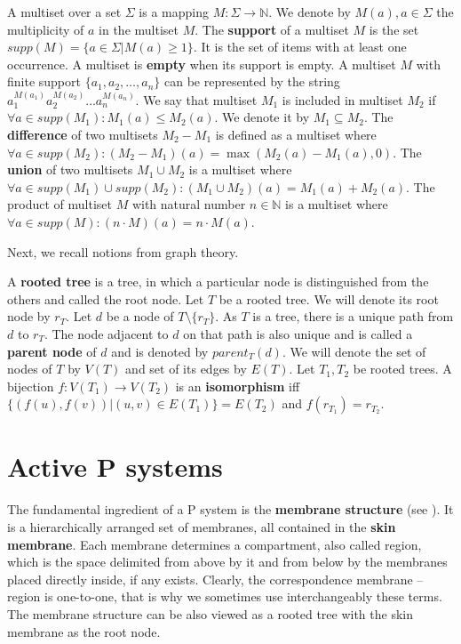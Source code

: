 \documentclass[llncs,submission,copyright,creativecommons]{../lib/lncs/llncs}
\begin{document}
A multiset over a set $\Sigma$ is a mapping $M: \Sigma\rightarrow \mathbb N$.
We denote by $M(a), a\in \Sigma$ the multiplicity of $a$ in the multiset $M$.
The {\bf support} of a multiset $M$ is the set $supp(M)=\{a\in \Sigma|M(a)\geq 1\}$.
It is the set of items with at least one occurrence.
A multiset is {\bf empty} when its support is empty.
A multiset $M$ with finite support $\{a_1, a_2, \dots, a_n\}$ can be represented by the string $a_1^{M(a_1)}a_2^{M(a_2)}\dots a_n^{M(a_n)}$.
We say that multiset $M_1$ is included in multiset $M_2$ if $\forall a \in supp(M_1): M_1(a)\leq M_2(a)$.
We denote it by $M_1\subseteq M_2$.
The {\bf difference} of two multisets $M_2-M_1$ is defined as a multiset where $\forall a \in supp(M_2): (M_2-M_1)(a)=\max(M_2(a)-M_1(a),0)$.
The {\bf union} of two multisets $M_1\cup M_2$ is a multiset where $\forall a \in supp(M_1)\cup supp(M_2): (M_1\cup M_2)(a)=M_1(a)+M_2(a)$.
The product of multiset $M$ with natural number $n\in \mathbb N$ is a multiset where $\forall a \in supp(M): (n\cdot M)(a)=n\cdot M(a)$.

Next, we recall notions from graph theory.

A {\bf rooted tree} is a tree, in which a particular node is distinguished from the others and called the root node.
Let $T$ be a rooted tree. We will denote its root node by $r_T$.
Let $d$ be a node of $T\setminus\{r_T\}$.
As $T$ is a tree, there is a unique path from $d$ to $r_T$. 
The node adjacent to $d$ on that path is also unique and is called a {\bf parent node} of $d$ and is denoted by $parent_T(d)$.
We will denote the set of nodes of $T$ by $V(T)$ and set of its edges by $E(T)$.
Let $T_1, T_2$ be rooted trees. A bijection $f: V(T_1)\rightarrow V(T_2)$ is an {\bf isomorphism} iff $\{(f(u),f(v))|(u,v)\in E(T_1)\} = E(T_2)$ and $f(r_{T_1}) = r_{T_2}$. 

  
\section{Active P systems}
\label{sec:p systems}


The fundamental ingredient of a P system is the {\bf membrane structure} (see \cite{Paun2006Introduction}). It is a hierarchically arranged set of membranes, all contained in the {\bf skin membrane}. Each membrane determines a compartment, also called region, which is the space delimited from above by it and from below by the membranes placed directly inside, if any exists. Clearly, the correspondence membrane – region is one-to-one, that is why we sometimes use interchangeably these terms.
The membrane structure can be also viewed as a rooted tree with the skin membrane as the root node.
\end{document}
